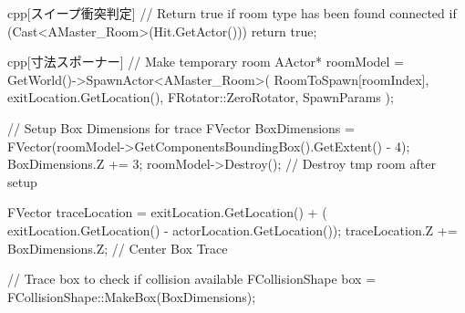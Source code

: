 \documentclass{../../Styles/AI-Research-STY}
\begin{document}
\begin{Form}
\begin{codeBlock}{cpp}[スイープ衝突判定]
// Return true if room type has been found connected
if (Cast<AMaster_Room>(Hit.GetActor())) return true;
    \end{codeBlock}


    \begin{codeBlock}{cpp}[寸法スポーナー]
// Make temporary room
AActor* roomModel = GetWorld()->SpawnActor<AMaster_Room>(
    RoomToSpawn[roomIndex],
    exitLocation.GetLocation(),
    FRotator::ZeroRotator,
    SpawnParams
);

// Setup Box Dimensions for trace
FVector BoxDimensions = FVector(roomModel->GetComponentsBoundingBox().GetExtent() - 4);
BoxDimensions.Z += 3;
roomModel->Destroy(); // Destroy tmp room after setup

FVector traceLocation = exitLocation.GetLocation() + (
    exitLocation.GetLocation() - actorLocation.GetLocation());
traceLocation.Z += BoxDimensions.Z; // Center Box Trace

// Trace box to check if collision available
FCollisionShape box = FCollisionShape::MakeBox(BoxDimensions);
    \end{codeBlock}

\end{Form}
\end{document}
